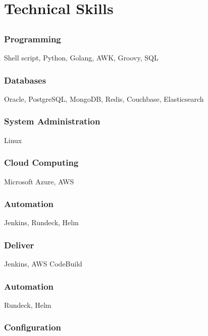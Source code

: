 \documentclass{article}
\begin{document}
\section{Technical Skills}

\subsection{}

\subsubsection{Programming}

Shell script, Python, Golang, AWK, Groovy, SQL

\subsubsection{Databases}

Oracle, PostgreSQL, MongoDB, Redis, Couchbase, Elasticsearch

\subsubsection{System Administration}

Linux

\subsubsection{Cloud Computing}

Microsoft Azure, AWS

\subsubsection{Automation}

Jenkins, Rundeck, Helm

\subsubsection{Deliver}

Jenkins, AWS CodeBuild

\subsubsection{Automation}

Rundeck, Helm

\subsubsection{Configuration}
\end{document}
